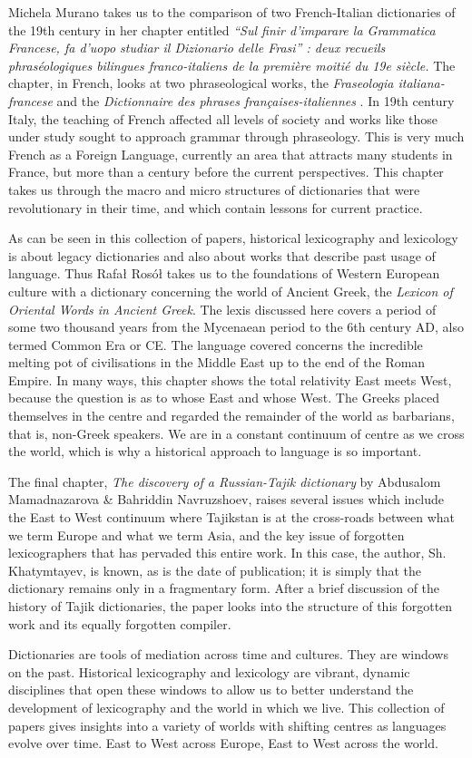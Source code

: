 \documentclass[output=paper]{langscibook}
\begin{document}
Michela Murano takes us to the comparison of two French-Italian dictionaries of the 19th century in her chapter entitled \textit{“Sul finir d’imparare la Grammatica Francese, fa d’uopo studiar il Dizionario delle Frasi” : deux recueils phraséologiques bilingues franco-italiens de la première moitié du 19e siècle.} The chapter, in French, looks at two phraseological works, the \textit{Fraseologia italiana-francese} \citep{Trucchi1825} and the \textit{Dictionnaire des phrases françaises-italiennes} \citep{Lanza1837}. In 19th century Italy, the teaching of French affected all levels of society and works like those under study sought to approach grammar through phraseology. This is very much French as a Foreign Language, currently an area that attracts many students in France, but more than a century before the current perspectives. This chapter takes us through the macro and micro structures of dictionaries that were revolutionary in their time, and which contain lessons for current practice.

As can be seen in this collection of papers, historical lexicography and lexicology is about legacy dictionaries and also about works that describe past usage of language. Thus Rafał Rosół takes us to the foundations of Western European culture with a dictionary concerning the world of Ancient Greek, the \textit{Lexicon of Oriental Words in Ancient Greek}. The lexis discussed here covers a period of some two thousand years from the Mycenaean period to the 6th century AD, also termed Common Era or CE. The language covered concerns the incredible melting pot of civilisations in the Middle East up to the end of the Roman Empire. In many ways, this chapter shows the total relativity East meets West, because the question is as to whose East and whose West. The Greeks placed themselves in the centre and regarded the remainder of the world as barbarians, that is, non-Greek speakers. We are in a constant continuum of centre as we cross the world, which is why a historical approach to language is so important.

The final chapter, \textit{The discovery of a Russian-Tajik dictionary} by Abdusalom Mamadnazarova \& Bahriddin Navruzshoev, raises several issues which include the East to West continuum where Tajikstan is at the cross-roads between what we term Europe and what we term Asia, and the key issue of forgotten lexicographers that has pervaded this entire work. In this case, the author, Sh. Khatymtayev, is known, as is the date of publication; it is simply that the dictionary remains only in a fragmentary form. After a brief discussion of the history of Tajik dictionaries, the paper looks into the structure of this forgotten work and its equally forgotten compiler.

Dictionaries are tools of mediation across time and cultures. They are windows on the past. Historical lexicography and lexicology are vibrant, dynamic disciplines that open these windows to allow us to better understand the development of lexicography and the world in which we live. This collection of papers gives insights into a variety of worlds with shifting centres as languages evolve over time. East to West across Europe, East to West across the world.

{\sloppy\printbibliography[heading=subbibliography,notkeyword=this]}
\end{document}
